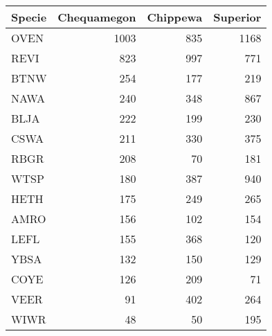 \begin{table}[ht]
\begin{center}
\begin{tabular}{lrrr}
  \hline
Specie & Chequamegon & Chippewa & Superior \\ 
  \hline
OVEN & 1003 & 835 & 1168 \\ 
  REVI & 823 & 997 & 771 \\ 
  BTNW & 254 & 177 & 219 \\ 
  NAWA & 240 & 348 & 867 \\ 
  BLJA & 222 & 199 & 230 \\ 
  CSWA & 211 & 330 & 375 \\ 
  RBGR & 208 &  70 & 181 \\ 
  WTSP & 180 & 387 & 940 \\ 
  HETH & 175 & 249 & 265 \\ 
  AMRO & 156 & 102 & 154 \\ 
  LEFL & 155 & 368 & 120 \\ 
  YBSA & 132 & 150 & 129 \\ 
  COYE & 126 & 209 &  71 \\ 
  VEER &  91 & 402 & 264 \\ 
  WIWR &  48 &  50 & 195 \\ 
   \hline
\end{tabular}
\end{center}
\end{table}
